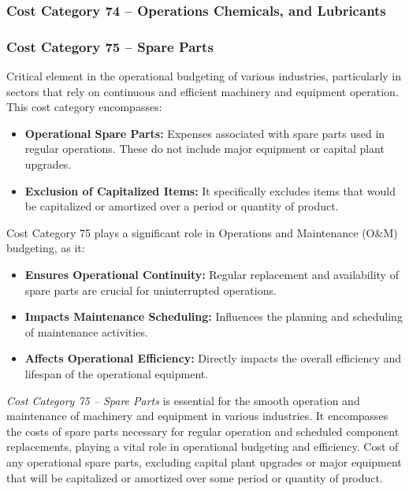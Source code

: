\subsubsection*{Cost Category 74 – Operations Chemicals, and Lubricants}

\subsubsection*{Cost Category 75 – Spare Parts}
Critical element in the operational budgeting of various industries, particularly in sectors that rely on continuous and efficient machinery and equipment operation.  This cost category encompasses:

\begin{itemize}
    \item \textbf{Operational Spare Parts:} Expenses associated with spare parts used in regular operations. These do not include major equipment or capital plant upgrades.
    \item \textbf{Exclusion of Capitalized Items:} It specifically excludes items that would be capitalized or amortized over a period or quantity of product.
\end{itemize}

Cost Category 75 plays a significant role in Operations and Maintenance (O\&M) budgeting, as it:

\begin{itemize}
    \item \textbf{Ensures Operational Continuity:} Regular replacement and availability of spare parts are crucial for uninterrupted operations.
    \item \textbf{Impacts Maintenance Scheduling:} Influences the planning and scheduling of maintenance activities.
    \item \textbf{Affects Operational Efficiency:} Directly impacts the overall efficiency and lifespan of the operational equipment.
\end{itemize}

\textit{Cost Category 75 – Spare Parts} is essential for the smooth operation and maintenance of machinery and equipment in various industries. It encompasses the costs of spare parts necessary for regular operation and scheduled component replacements, playing a vital role in operational budgeting and efficiency.  Cost of any operational spare parts, excluding capital plant upgrades or major equipment that will be capitalized or amortized over some period or quantity of product.


